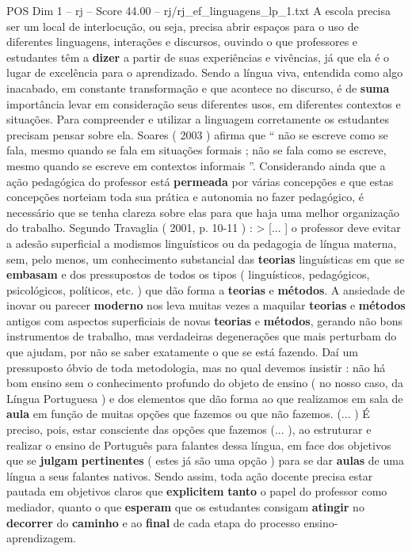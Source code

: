 \begin{textsample}{POS Dim 1 – rj – Score 44.00 – rj/rj\_ef\_linguagens\_lp\_1.txt}
A escola precisa ser um local de interlocução, ou seja, precisa abrir espaços para o uso de diferentes linguagens, interações e discursos, ouvindo o que professores e estudantes têm a \textbf{dizer} a partir de suas experiências e vivências, já que ela é o lugar de excelência para o aprendizado.
Sendo a língua viva, entendida como algo inacabado, em constante transformação e que acontece no discurso, é de \textbf{suma} importância levar em consideração seus diferentes usos, em diferentes contextos e situações.
Para compreender e utilizar a linguagem corretamente os estudantes precisam pensar sobre ela.
Soares ( 2003 ) afirma que “ não se escreve como se fala, mesmo quando se fala em situações formais ; não se fala como se escreve, mesmo quando se escreve em contextos informais ”.
Considerando ainda que a ação pedagógica do professor está \textbf{permeada} por várias concepções e que estas concepções norteiam toda sua prática e autonomia no fazer pedagógico, é necessário que se tenha clareza sobre elas para que haja uma melhor organização do trabalho.
Segundo Travaglia ( 2001, p. 10-11 ) : > [... ] o professor deve evitar a adesão superficial a modismos linguísticos ou da pedagogia de língua materna, sem, pelo menos, um conhecimento substancial das \textbf{teorias} linguísticas em que se \textbf{embasam} e dos pressupostos de todos os tipos ( linguísticos, pedagógicos, psicológicos, políticos, etc. ) que dão forma a \textbf{teorias} e \textbf{métodos}.
A ansiedade de inovar ou parecer \textbf{moderno} nos leva muitas vezes a maquilar \textbf{teorias} e \textbf{métodos} antigos com aspectos superficiais de novas \textbf{teorias} e \textbf{métodos}, gerando não bons instrumentos de trabalho, mas verdadeiras degenerações que mais perturbam do que ajudam, por não se saber exatamente o que se está fazendo.
Daí um pressuposto óbvio de toda metodologia, mas no qual devemos insistir : não há bom ensino sem o conhecimento profundo do objeto de ensino ( no nosso caso, da Língua Portuguesa ) e dos elementos que dão forma ao que realizamos em sala de \textbf{aula} em função de muitas opções que fazemos ou que não fazemos. (... ) É preciso, pois, estar consciente das opções que fazemos (... ), ao estruturar e realizar o ensino de Português para falantes dessa língua, em face dos objetivos que se \textbf{julgam} \textbf{pertinentes} ( estes já são uma opção ) para se dar \textbf{aulas} de uma língua a seus falantes nativos.
Sendo assim, toda ação docente precisa estar pautada em objetivos claros que \textbf{explicitem} \textbf{tanto} o papel do professor como mediador, quanto o que \textbf{esperam} que os estudantes consigam \textbf{atingir} no \textbf{decorrer} do \textbf{caminho} e ao \textbf{final} de cada etapa do processo ensino-aprendizagem.

\end{textsample}
